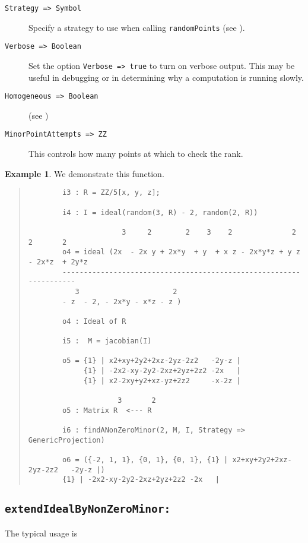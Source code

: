 \documentclass[11pt]{amsart}
\theoremstyle{definition}
\newtheorem{example}{Example}[section]
\begin{document}
\begin{description}
\item[\tt Strategy => Symbol] Specify a strategy to use when calling {\tt randomPoints} (see ).
  
\item[\tt Verbose => Boolean]
  Set the option {\tt Verbose => true} to turn on verbose output.  This may be useful in debugging or in determining why a computation is running slowly.
  
\item[\tt Homogeneous => Boolean] (see )
  
\item[\tt MinorPointAttempts => ZZ] 
  This controls how many points at which to check the rank.
\end{description}
\begin{example}
  We demonstrate this function.
  {{\small\color{blue}
  \begin{quote}
\begin{verbatim}
		i3 : R = ZZ/5[x, y, z];
		
		i4 : I = ideal(random(3, R) - 2, random(2, R))
		
		              3     2        2    3    2              2        2       2
		o4 = ideal (2x  - 2x y + 2x*y  + y  + x z - 2x*y*z + y z - 2x*z  + 2y*z 
		-------------------------------------------------------------------
		   3                      2
		- z  - 2, - 2x*y - x*z - z )
		
		o4 : Ideal of R
		
		i5 :  M = jacobian(I)
		
		o5 = {1} | x2+xy+2y2+2xz-2yz-2z2   -2y-z |
		     {1} | -2x2-xy-2y2-2xz+2yz+2z2 -2x   |
		     {1} | x2-2xy+y2+xz-yz+2z2     -x-2z |
		
		             3       2
		o5 : Matrix R  <--- R
		
		i6 : findANonZeroMinor(2, M, I, Strategy => GenericProjection)
		
		o6 = ({-2, 1, 1}, {0, 1}, {0, 1}, {1} | x2+xy+2y2+2xz-2yz-2z2   -2y-z |)
		{1} | -2x2-xy-2y2-2xz+2yz+2z2 -2x   |
\end{verbatim}
\end{quote}  
    }}
\end{example}

\subsection{\tt extendIdealByNonZeroMinor:}\label{extendIdealByNonZeroMinor} The typical usage is 
\end{document}

